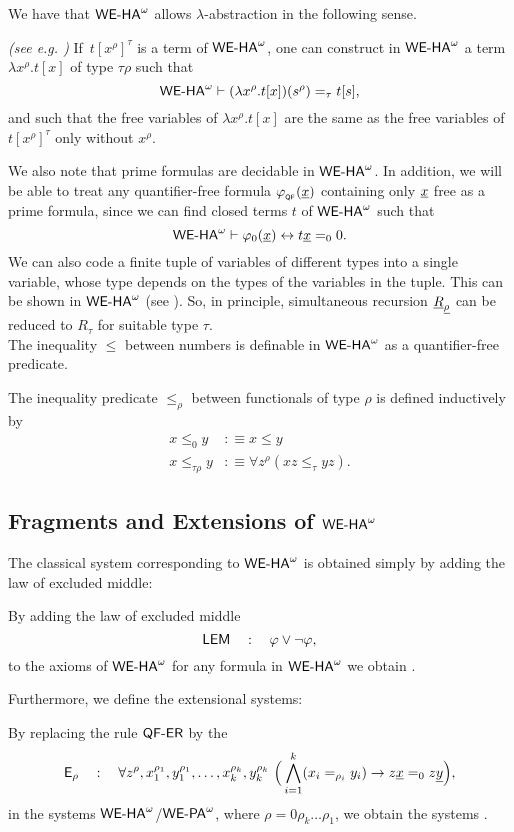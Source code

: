 We have that ${\textsf{\upshape WE-HA}}^{\omega}$ allows $\lambda$-abstraction in the
following sense.
\begin{lemma}\emph{(see e.g. \cite{Kohlenbach08})} 
If $\,t[x^{\rho}]^{\tau}$ is a term of ${\textsf{\upshape WE-HA}}^{\omega}$, one can
construct in ${\textsf{\upshape WE-HA}}^{\omega}$ a term $\lambda x^{\rho}. t[x]$ of type 
$\tau\rho$ such that
\[ {\textsf{\upshape WE-HA}}^{\omega} \vdash (\lambda x^{\rho}. t[x])(s^{\rho}) =_{\tau} t[s], \]
and such that the free variables of $\lambda x^{\rho}. t[x]$ are the
same as the free variables of $t[x^{\rho}]^{\tau}$ only without
$x^{\rho}$.
\end{lemma}
We also note that 
prime formulas are decidable in ${\textsf{\upshape WE-HA}}^{\omega}$. In addition,
 we will be able to treat any quantifier-free formula
$\varphi_{{}_{\textsf{\upshape QF}}}(\underline x)$ containing only $\underline x$ free
as a prime formula, since we can find closed terms
$t$ of ${\textsf{\upshape WE-HA}}^{\omega}$
such that 
\[ {\textsf{\upshape WE-HA}}^{\omega} \vdash \varphi_{0}(\underline{x}) \leftrightarrow t
\underline{x} =_{0}0\text{.}\]
We can also code a finite tuple of variables of different 
types into a single variable, whose type depends on the types of the
variables in the tuple. This can be shown in ${\textsf{\upshape WE-HA}}^{\omega}$ 
(see \cite{Troelstra73}). So, in principle, simultaneous recursion
$\underline R_{\underline\rho}$ can be reduced to $R_\tau$ for suitable type $\tau$.\\
The inequality $\leq$ between numbers is definable in ${\textsf{\upshape WE-HA}}^{\omega}$ as 
a quantifier-free predicate. 
\begin{dfn}\label{d:leq}
The inequality predicate $\leq_{\rho}$ between functionals of type
$\rho$ is defined inductively by
\setcounter{equation}{0}
\begin{align}
  x \leq_{0} y &:\equiv x \leq y\\
  x \leq_{\tau \rho} y &:\equiv \forall z^{\rho}(xz\leq_{\tau} yz)\text{.} 
\end{align}
\end{dfn}

\subsection{Fragments and Extensions of ${\textsf{\upshape WE-HA}}^{\omega}$}
%
%
The classical system corresponding to ${\textsf{\upshape WE-HA}}^{\omega}$ is obtained simply by
adding the law of excluded middle:
\begin{dfn} 
\label{d:wepa}
By adding the law of excluded middle 
\[ \textsf{\upshape LEM}\quad:\quad \varphi \vee \neg \varphi\text{,} \]
to the axioms of ${\textsf{\upshape WE-HA}}^{\omega}$ for any formula in ${\textsf{\upshape WE-HA}}^{\omega}$ we obtain .
\end{dfn}
%
Furthermore, we define the extensional systems:
\begin{dfn} 
\label{d:eha_epa}
By replacing the rule $\textsf{\upshape QF-}\textsf{\upshape ER}$ by the 
\[ 
\defkeyn{\usftext{E}}_\rho\quad:\quad 
 \forall z^{\rho},x_1^{\rho_1},y_1^{\rho_1},\ldots,x_k^{\rho_k},y_k^{\rho_k}
   \ \Big( 
\bigwedge_{i=1}^{k}
( x_i=_{\rho_i} y_i ) \rightarrow z\tup x=_0 z \tup y \Big)
\text{,} 
\]
in the systems ${\textsf{\upshape WE-HA}}^{\omega}$/${\textsf{\upshape WE-PA}}^{\omega}$, where $\rho=0\rho_k\ldots\rho_1$, we obtain the systems .
\end{dfn}

